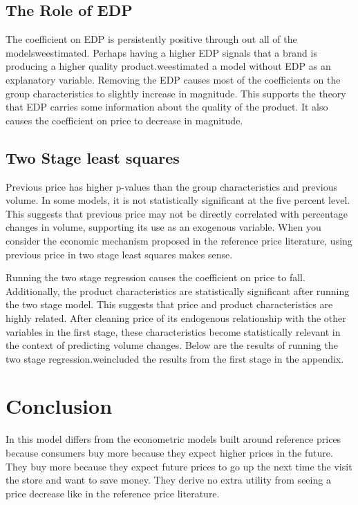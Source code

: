 \documentclass{article}
\begin{document}
\subsection{The Role of EDP}

The coefficient on EDP is persistently positive through out all of the modelsweestimated. Perhaps having a higher EDP signals that a brand is producing a higher quality product.weestimated a model without EDP as an explanatory variable. Removing the EDP causes most of the coefficients on the group characteristics to slightly increase in magnitude. This supports the theory that EDP carries some information about the quality of the product. It also causes the coefficient on price to decrease in magnitude.


\subsection{Two Stage least squares}

Previous price has higher p-values than the group characteristics and previous volume. In some models, it is not statistically significant at the five percent level. This suggests that previous price may not be directly correlated with percentage changes in volume, supporting its use as an exogenous variable. When you consider the economic mechanism proposed in the reference price literature, using previous price in two stage least squares makes sense.

Running the two stage regression causes the coefficient on price to fall. Additionally, the product characteristics are statistically significant after running the two stage model. This suggests that price and product characteristics are highly related. After cleaning price of its endogenous relationship with the other variables in the first stage, these characteristics become statistically relevant in the context of predicting volume changes. Below are the results of running the two stage regression.weincluded the results from the first stage in the appendix.

\section{Conclusion}
In this model differs from the econometric models built around reference prices because consumers buy more because they expect higher prices in the future. They buy more because they expect future prices to go up the next time the visit the store and want to save money. They derive no extra utility from seeing a price decrease like in the reference price literature.
\end{document}
